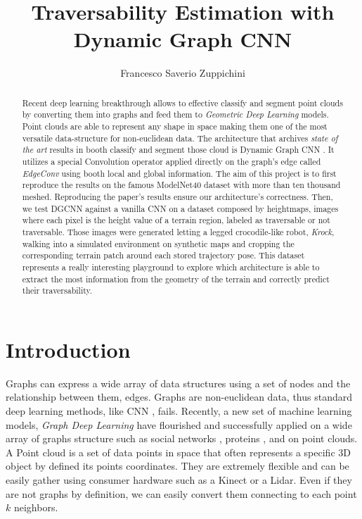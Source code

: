\documentclass[twocolumn,showpacs,
  nofootinbib,aps,superscriptaddress,
  eqsecnum,prd,notitlepage,showkeys,10pt]{revtex4-1}
\begin{document}
\title{Traversability Estimation with Dynamic Graph CNN}
\author{Francesco Saverio Zuppichini}
\begin{abstract}
  Recent deep learning breakthrough allows to effective classify and segment point clouds by converting them into graphs and feed them to \emph{Geometric Deep Learning} models. Point clouds are able to represent any shape in space making them one of the most versatile data-structure for non-euclidean data. The architecture that archives \emph{state of the art} results in booth classify and segment those cloud is Dynamic Graph CNN \cite{dgcnn}. It utilizes a special Convolution operator applied directly on the graph's edge called \emph{EdgeConv} using booth local and global information. The aim of this project is to first reproduce the results on the famous ModelNet40 \cite{shapenet} dataset with more than ten thousand meshed. Reproducing the paper's results ensure our architecture's correctness.
  Then, we test DGCNN against a vanilla CNN on a dataset composed by heightmaps, images where each pixel is the height value of a terrain region, labeled as traversable or not traversable. Those images were generated letting a legged crocodile-like robot, \emph{Krock}, walking into a simulated environment on synthetic maps and cropping the corresponding terrain patch around each stored trajectory pose. This dataset represents a really interesting playground to explore which architecture is able to extract the most information from the geometry of the terrain and correctly predict their traversability. 
\end{abstract}
\maketitle
\section{Introduction}

Graphs can express a wide array of data structures using a set of nodes and the relationship between them, edges. Graphs are non-euclidean data, thus standard deep learning methods, like CNN \cite{cnn}, fails. Recently, a new set of machine learning models, \emph{Graph Deep Learning} have flourished and successfully applied on a wide array of graphs structure such as social networks , proteins , and on point clouds. A Point cloud is a set of data points in space that often represents a specific 3D object by defined its points coordinates. They are extremely flexible and can be easily gather using consumer hardware such as a Kinect or a Lidar. Even if they are not graphs by definition, we can easily convert them connecting to each point $k$ neighbors.
\end{document}
